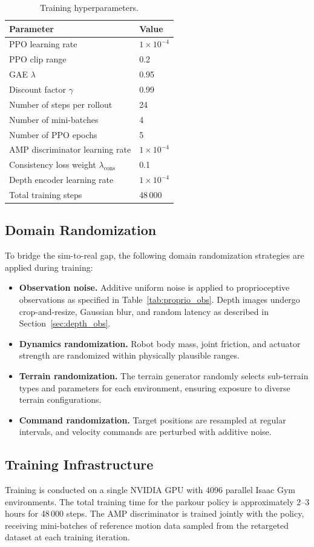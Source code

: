 \begin{table}[t]
\centering
\caption{Training hyperparameters.}
\label{tab:hyperparams}
\begin{tabular}{ll}
\toprule
\textbf{Parameter} & \textbf{Value} \\
\midrule
PPO learning rate & $1 \times 10^{-4}$ \\
PPO clip range & 0.2 \\
GAE $\lambda$ & 0.95 \\
Discount factor $\gamma$ & 0.99 \\
Number of steps per rollout & 24 \\
Number of mini-batches & 4 \\
Number of PPO epochs & 5 \\
AMP discriminator learning rate & $1 \times 10^{-4}$ \\
Consistency loss weight $\lambda_{\text{cons}}$ & 0.1 \\
Depth encoder learning rate & $1 \times 10^{-4}$ \\
Total training steps & 48\,000 \\
\bottomrule
\end{tabular}
\end{table}

\subsection{Domain Randomization}
\label{sec:ch6_domain_randomization}

To bridge the sim-to-real gap, the following domain randomization strategies are applied during training:

\begin{itemize}
    \item \textbf{Observation noise.} Additive uniform noise is applied to proprioceptive observations as specified in Table~\ref{tab:proprio_obs}. Depth images undergo crop-and-resize, Gaussian blur, and random latency as described in Section~\ref{sec:depth_obs}.
    \item \textbf{Dynamics randomization.} Robot body mass, joint friction, and actuator strength are randomized within physically plausible ranges.
    \item \textbf{Terrain randomization.} The terrain generator randomly selects sub-terrain types and parameters for each environment, ensuring exposure to diverse terrain configurations.
    \item \textbf{Command randomization.} Target positions are resampled at regular intervals, and velocity commands are perturbed with additive noise.
\end{itemize}

\subsection{Training Infrastructure}

Training is conducted on a single NVIDIA GPU with 4096 parallel Isaac Gym environments. The total training time for the parkour policy is approximately 2--3 hours for 48\,000 steps. The AMP discriminator is trained jointly with the policy, receiving mini-batches of reference motion data sampled from the retargeted dataset at each training iteration.